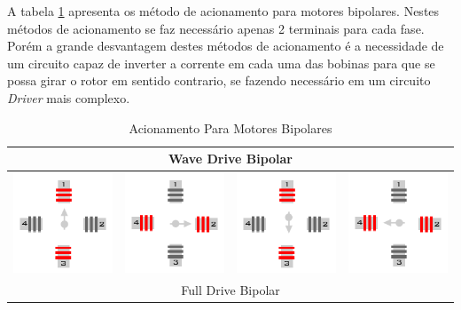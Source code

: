 A tabela \ref{Table:AcionamentoBipolar} apresenta os método de acionamento para motores bipolares. Nestes métodos de acionamento se faz necessário apenas 2 terminais para cada fase. Porém a grande desvantagem destes métodos de acionamento é a necessidade de um circuito capaz de inverter a corrente em cada uma das bobinas para que se possa girar o rotor em sentido contrario, se fazendo necessário em um circuito \emph{Driver} mais complexo. 

\begin{table}[H]
	\centering
	\caption{Acionamento Para Motores Bipolares}
	\label{Table:AcionamentoBipolar}
	\begin{tabular}{|cccc|}
		\hline
		\multicolumn{4}{|c|}{Wave Drive Bipolar}  \\
		\hline
		\includegraphics[width = 0.15\columnwidth]{Images/AcionamentoDoHSM/Bipolar/WaveDrive/WaveDriveI.png} & \includegraphics[width = 0.15\columnwidth]{Images/AcionamentoDoHSM/Bipolar/WaveDrive/WaveDriveII.png} & \includegraphics[width = 0.15\columnwidth]{Images/AcionamentoDoHSM/Bipolar/WaveDrive/WaveDriveIII.png} & \includegraphics[width = 0.15\columnwidth]{Images/AcionamentoDoHSM/Bipolar/WaveDrive/WaveDriveIV.png} \\
		\hline
		\multicolumn{4}{|c|}{Full Drive Bipolar}  \\
		\hline

\end{tabular}
\end{table}
